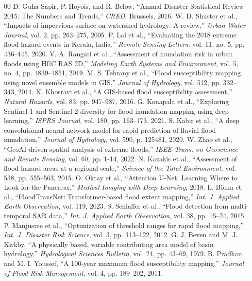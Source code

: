 \documentclass[conference]{IEEEtran}
\begin{document}
\begin{thebibliography}{00}
 D. Guha-Sapir, P. Hoyois, and R. Below, ``Annual Disaster Statistical Review 2015: The Numbers and Trends,'' \textit{CRED}, Brussels, 2016.
 W. D. Shuster et al., ``Impacts of impervious surface on watershed hydrology: A review,'' \textit{Urban Water Journal}, vol. 2, pp. 263--275, 2005.
 P. Lal et al., ``Evaluating the 2018 extreme flood hazard events in Kerala, India,'' \textit{Remote Sensing Letters}, vol. 11, no. 5, pp. 436--445, 2020.
 V. A. Rangari et al., ``Assessment of inundation risk in urban floods using HEC RAS 2D,'' \textit{Modeling Earth Systems and Environment}, vol. 5, no. 4, pp. 1839--1851, 2019.
 M. S. Tehrany et al., ``Flood susceptibility mapping using novel ensemble models in GIS,'' \textit{Journal of Hydrology}, vol. 512, pp. 332--343, 2014.
 K. Khosravi et al., ``A GIS-based flood susceptibility assessment,'' \textit{Natural Hazards}, vol. 83, pp. 947--987, 2016.
 G. Konapala et al., ``Exploring Sentinel-1 and Sentinel-2 diversity for flood inundation mapping using deep learning,'' \textit{ISPRS Journal}, vol. 180, pp. 163--173, 2021.
 S. Kabir et al., ``A deep convolutional neural network model for rapid prediction of fluvial flood inundation,'' \textit{Journal of Hydrology}, vol. 590, p. 125481, 2020.
 W. Zhao et al., ``GeoAI driven spatial analysis of extreme floods,'' \textit{IEEE Trans. on Geoscience and Remote Sensing}, vol. 60, pp. 1-14, 2022.
 N. Kazakis et al., ``Assessment of flood hazard areas at a regional scale,'' \textit{Science of the Total Environment}, vol. 538, pp. 555--563, 2015.
 O. Oktay et al., ``Attention U-Net: Learning Where to Look for the Pancreas,'' \textit{Medical Imaging with Deep Learning}, 2018.
 L. B\"{o}hm et al., ``FloodTransNet: Transformer-based flood extent mapping,'' \textit{Int. J. Applied Earth Observation}, vol. 119, 2023.
 S. Schlaffer et al., ``Flood detection from multi-temporal SAR data,'' \textit{Int. J. Applied Earth Observation}, vol. 38, pp. 15--24, 2015.
 P. Manjusree et al., ``Optimization of threshold ranges for rapid flood mapping,'' \textit{Int. J. Disaster Risk Science}, vol. 3, pp. 113--122, 2012.
 G. J. Beven and M. J. Kirkby, ``A physically based, variable contributing area model of basin hydrology,'' \textit{Hydrological Sciences Bulletin}, vol. 24, pp. 43--69, 1979.
 B. Pradhan and M. I. Youssef, ``A 100-year maximum flood susceptibility mapping,'' \textit{Journal of Flood Risk Management}, vol. 4, pp. 189--202, 2011.

\end{thebibliography}
\end{document}
